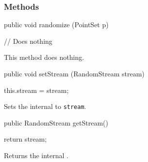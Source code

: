 \subsubsection*{Methods}
\begin{code}

   public void randomize (PointSet p) \begin{hide} {
      // Does nothing
   } \end{hide}
\end{code}
\begin{tabb}
   This method does nothing.
\end{tabb}
\begin{htmlonly}
\end{htmlonly}
\begin{code}

   public void setStream (RandomStream stream) \begin{hide} {
      this.stream = stream;
   } \end{hide}
\end{code}
\begin{tabb}
   Sets the internal
    to
   \texttt{stream}.
\end{tabb}
\begin{htmlonly}
\end{htmlonly}
\begin{code}

   public RandomStream getStream() \begin{hide} {
      return stream;
   } \end{hide}
\end{code}
\begin{tabb}
   Returns the internal
   .
\end{tabb}
\begin{htmlonly}
\end{htmlonly}
\begin{code}\begin{hide}
}
\end{hide}\end{code}
